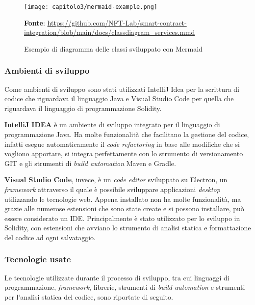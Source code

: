 \begin{figure}[h!]
  \centering
  \texttt{[image: capitolo3/mermaid-example.png]}
  \caption{Esempio di diagramma delle classi sviluppato con Mermaid}
  \textbf{Fonte}: \href{https://github.com/NFT-Lab/smart-contract-integration/blob/main/docs/classdiagram\_services.mmd}{https://github.com/NFT-Lab/smart-contract-integration/blob/main/docs/classdiagram\_services.mmd}
\end{figure}

\subsubsection{Ambienti di sviluppo}
Come ambienti di sviluppo sono stati utilizzati IntelliJ Idea per la scrittura di codice che riguardava il linguaggio Java e Visual Studio Code per quella che riguardava il linguaggio di programmazione Solidity.

\textbf{IntelliJ IDEA} è un ambiente di sviluppo integrato per il linguaggio di programmazione Java. Ha molte funzionalità che facilitano la gestione del codice, infatti esegue automaticamente il \textit{code refactoring} in base alle modifiche che si vogliono apportare, si integra perfettamente con lo strumento di versionamento GIT e gli strumenti di \textit{build automation} Maven e Gradle.

\textbf{Visual Studio Code}, invece, è un \textit{code editor} sviluppato su Electron, un \textit{framework} attraverso il quale è possibile sviluppare applicazioni \textit{desktop} utilizzando le tecnologie web. Appena installato non ha molte funzionalità, ma grazie alle numerose estensioni che sono state create e si possono installare, può essere considerato un IDE. Principalmente è stato utilizzato per lo sviluppo in Solidity, con estensioni che avviano lo strumento di analisi statica e formattazione del codice ad ogni salvataggio.

\subsubsection{Tecnologie usate}
Le tecnologie utilizzate durante il processo di sviluppo, tra cui linguaggi di programmazione, \textit{framework}, librerie, strumenti di \textit{build automation} e strumenti per l'analisi statica del codice, sono riportate di seguito.


